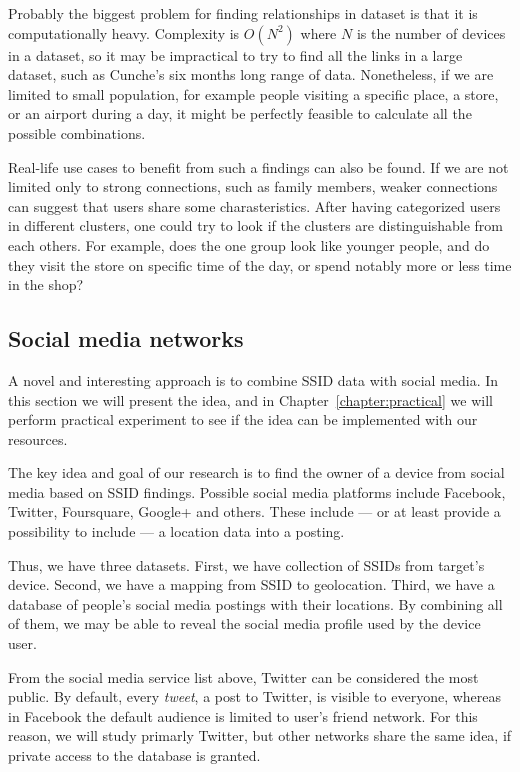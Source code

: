 \documentclass[12pt,a4paper,oneside,pdftex]{report}
\begin{document}
Probably the biggest problem for finding relationships in dataset is that it is computationally heavy. Complexity is $O(N^2)$ where $N$ is the number of devices in a dataset, so it may be impractical to try to find all the links in a large dataset, such as Cunche's six months long range of data. Nonetheless, if we are limited to small population, for example people visiting a specific place, a store, or an airport during a day, it might be perfectly feasible to calculate all the possible combinations.

Real-life use cases to benefit from such a findings can also be found. If we are not limited only to strong connections, such as family members, weaker connections can suggest that users share some charasteristics. After having categorized users in different clusters, one could try to look if the clusters are distinguishable from each others. For example, does the one group look like younger people, and do they visit the store on specific time of the day, or spend notably more or less time in the shop?

\subsection{Social media networks}
\label{subsec:social_media}

A novel and interesting approach is to combine SSID data with social media. In this section we will present the idea, and in Chapter~\ref{chapter:practical} we will perform practical experiment to see if the idea can be implemented with our resources.

The key idea and goal of our research is to find the owner of a device from social media based on SSID findings. Possible social media platforms include Facebook, Twitter, Foursquare, Google+ and others. These include --- or at least provide a possibility to include --- a location data into a posting. 

Thus, we have three datasets. First, we have collection of SSIDs from target's device. Second, we have a mapping from SSID to geolocation. Third, we have a database of people's social media postings with their locations. By combining all of them, we may be able to reveal the social media profile used by the device user.

From the social media service list above, Twitter can be considered the most public. By default, every \emph{tweet}, a post to Twitter, is visible to everyone, whereas in Facebook the default audience is limited to user's friend network. For this reason, we will study primarly Twitter, but other networks share the same idea, if private access to the database is granted.
\end{document}

